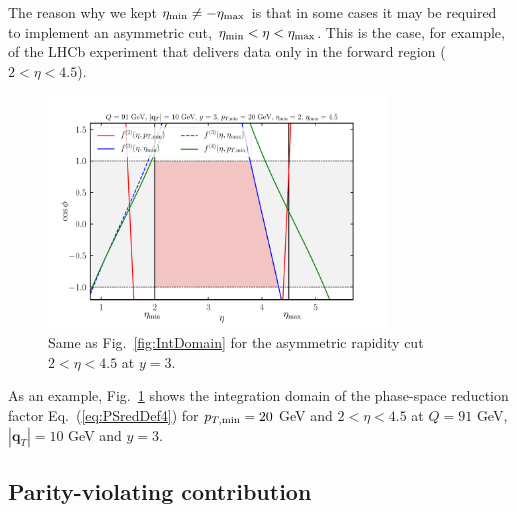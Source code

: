 \documentclass[10pt,a4paper]{article}
\begin{document}
The reason why we kept $\eta_{\rm min} \neq -\eta_{\rm max}$ is that
in some cases it may be required to implement an asymmetric cut,
$\eta_{\rm min}<\eta<\eta_{\rm max}$. This is the case, for example,
of the LHCb experiment that delivers data only in the forward region
($2 < \eta < 4.5$).
\begin{figure}[t]
  \begin{centering}
    \includegraphics[width=0.8\textwidth]{plots/IntDomainAsy}
    \caption{Same as Fig.~\ref{fig:IntDomain} for the asymmetric
      rapidity cut $2<\eta < 4.5$ at $y=3$.\label{fig:IntDomainAsy}}
  \end{centering}
\end{figure}
As an example, Fig.~\ref{fig:IntDomainAsy} shows the integration
domain of the phase-space reduction factor Eq.~(\ref{eq:PSredDef4})
for $p_{T,\rm min}=20$ GeV and $2<\eta < 4.5$ at $Q=91$ GeV,
$|\mathbf{q}_T|=10$ GeV and $y=3$.

\subsection{Parity-violating contribution}
\end{document}
